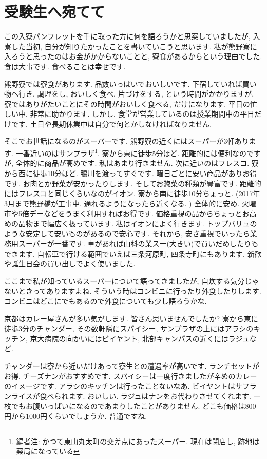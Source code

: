 \documentclass[10pt,b5jsbook,dvips,dvipdfmx,openany]{jsbook}
\theoremstyle{definition}
\begin{document}
		\section{受験生へ宛てて}

		この入寮パンフレットを手に取った方に何を語ろうかと思案していましたが, 入寮した当初, 自分が知りたかったことを書いていこうと思います.
私が熊野寮に入ろうと思ったのはお金がかからないことと, 寮食があるからという理由でした. 食は大事です. 食べることは幸せです.

		熊野寮では寮食があります. 品数いっぱいでおいしいです. 下宿していれば買い物へ行き, 調理をし, おいしく食べ, 片づけをする, という時間がかかりますが, 寮ではありがたいことにその時間がおいしく食べる, だけになります. 平日の忙しい中, 非常に助かります. しかし, 食堂が営業しているのは授業期間中の平日だけです. 土日や長期休業中は自分で何とかしなければなりません.

		そこでお世話になるのがスーパーです. 熊野寮の近くにはスーパーが3軒あります. 一番近いのはサンプラザ\footnote{編者注: かつて東山丸太町の交差点にあったスーパー. 現在は閉店し, 跡地は薬局になっている}. 寮から東に徒歩5分ほど. 距離的には便利なのですが, 全体的に商品が高めです. 私はあまり行きません. 次に近いのはフレスコ. 寮から西に徒歩10分ほど. 鴨川を渡ってすぐです. 曜日ごとに安い商品がありお得です. お肉とか野菜が安かったりします. そしてお惣菜の種類が豊富です. 距離的にはフレスコと同じくらいなのがイオン. 寮から南に徒歩10分ちょっと. (2017年3月まで熊野橋が工事中. 通れるようになったら近くなる. ) 全体的に安め. 火曜市や5倍デーなどをうまく利用すればお得です. 価格重視の品からちょっとお高めの品物まで幅広く扱っています. 私はイオンによく行きます. トップバリュのような安定して安いものがあるので安心です. それから, 安さ重視でいったら業務用スーパーが一番です. 車があれば山科の業スー(大きい)で買いだめしたりもできます. 自転車で行ける範囲でいえば三条河原町, 四条寺町にもあります. 新歓や誕生日会の買い出しでよく使いました.

		ここまで私が知っているスーパーについて語ってきましたが, 自炊する気分じゃないときってありますよね. そういう時はコンビニに行ったり外食したりします. コンビニはどこにでもあるので外食についても少し語ろうかな.

		京都はカレー屋さんが多い気がします. 皆さん思いませんでしたか? 寮から東に徒歩3分のチャンダー, その数軒隣にスパイシー, サンプラザの上にはアラシのキッチン, 京大病院の向かいにはビイヤント, 北部キャンパスの近くにはラジュなど.

		チャンダーは寮から近いだけあって寮生との遭遇率が高いです. ランチセットがお得. チーズナンがおすすめです. スパイシーは一度行きましたが辛めのカレーのイメージです. アラシのキッチンは行ったことないなあ. ビイヤントはサフランライスが食べられます. おいしい. ラジュはナンをお代わりさせてくれます. 一枚でもお腹いっぱいになるのであまりしたことがありません. どこも価格は800円から1000円くらいでしょうか. 普通ですね.
\end{document}
